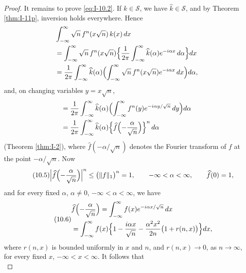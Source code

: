 \begin{proof}
It remains to prove \eqref{eq:I-10.2}. If $k\in\mathcal S$, we have $\widehat k\in\mathcal S$, and by Theorem \ref{thm:I-11p}, inversion holds everywhere. Hence
\begin{equation*}
\begin{aligned}
& \int_{-\infty}^{\infty}\sqrt n\,f^n(x\sqrt n)\,k(x)\,dx\\
&= \int_{-\infty}^{\infty}\sqrt n\,f^n(x\sqrt n)  \Bigl\{\frac{1}{2\pi}  \int_{-\infty}^{\infty}\widehat k(\alpha)e^{-i\alpha x}\,d\alpha\Bigr\}dx\\
&= \frac{1}{2\pi}\int_{-\infty}^{\infty}\widehat k(\alpha)\Bigl(\int_{-\infty}^{\infty}\sqrt n\,f^n(x\sqrt n)e^{-i\alpha x}\,dx\Bigr)d\alpha,
\end{aligned}
\end{equation*}
and, on changing variables $y=x\sqrt n$,
\begin{equation*}
\begin{aligned}
& = \frac{1}{2\pi}  \int_{-\infty}^{\infty}\widehat k(\alpha)  \Bigl(\int_{-\infty}^{\infty}f^n(y)e^{-i\alpha y/\sqrt n}\,dy\Bigr)d\alpha\\
&= \frac{1}{2\pi}  \int_{-\infty}^{\infty}\widehat k(\alpha)  \Bigl\{\widehat f  \Bigl(-\frac{\alpha}{\sqrt n}\Bigr)\Bigr\}^n\,d\alpha
\end{aligned}
\end{equation*}
(Theorem \ref{thm:I-2}), where $\widehat f(-\alpha/\sqrt n)$ denotes the Fourier transform of $f$ at the point $-\alpha/\sqrt n$. Now
\begin{equation}\label{eq:I-10.5}\tag{10.5}
\Bigl|\widehat f\Bigl(-\frac{\alpha}{\sqrt n}\Bigr)\Bigr|^n
\le\bigl(\|f\|_1\bigr)^n=1,\qquad-\infty<\alpha<\infty,\qquad \widehat f(0)=1,
\end{equation}
and for every fixed $\alpha$, $\alpha\neq 0$, $-\infty<\alpha<\infty$, we have
\begin{equation}\label{eq:I-10.6}\tag{10.6}
\begin{aligned}
&\widehat f  \Bigl(-\frac{\alpha}{\sqrt n}\Bigr) = \int_{-\infty}^{\infty}f(x)e^{-i\alpha x/\sqrt n}\,dx\\
&= \int_{-\infty}^{\infty}f(x)  \Bigl\{1 - \frac{i\alpha x}{\sqrt n} - \frac{\alpha^{2}x^{2}}{2n}  \bigl(1+r(n,x)\bigr)\Bigr\}dx,
\end{aligned}
\end{equation}
where $r(n,x)$ is bounded uniformly in $x$ and $n$, and $r(n,x)\to 0$, as $n\to\infty$, for every fixed $x$, $-\infty<x<\infty$. It follows that
\begin{equation*}

\end{equation*}
\end{proof}
